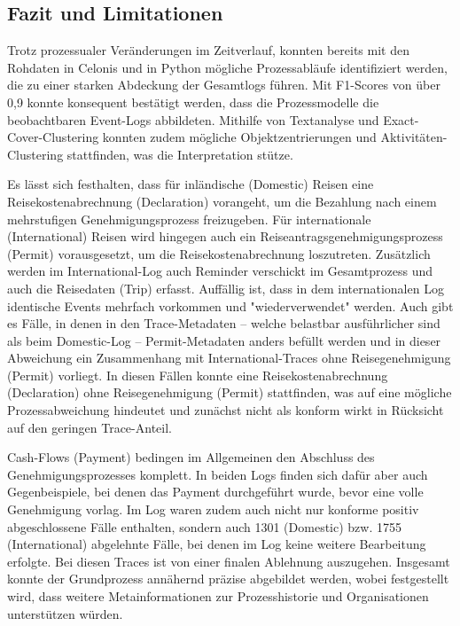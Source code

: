 \subsection{Fazit und Limitationen}
\label{sec:zusammenfassung}
Trotz prozessualer Veränderungen im Zeitverlauf, konnten bereits mit den Rohdaten in Celonis und in Python mögliche Prozessabläufe identifiziert werden, die zu einer starken Abdeckung der Gesamtlogs führen.
Mit F1-Scores von über 0,9 konnte konsequent bestätigt werden, dass die Prozessmodelle die beobachtbaren Event-Logs abbildeten.
Mithilfe von Textanalyse und Exact-Cover-Clustering konnten zudem mögliche Objektzentrierungen und Aktivitäten-Clustering stattfinden, was die Interpretation stütze.\par
Es lässt sich festhalten, dass für inländische (Domestic) Reisen eine Reisekostenabrechnung (Declaration) vorangeht, um die Bezahlung nach einem mehrstufigen Genehmigungsprozess freizugeben.
Für internationale (International) Reisen wird hingegen auch ein Reiseantragsgenehmigungsprozess (Permit) vorausgesetzt, um die Reisekostenabrechnung loszutreten. Zusätzlich werden im International-Log auch Reminder verschickt im Gesamtprozess und auch die Reisedaten (Trip) erfasst.
Auffällig ist, dass in dem internationalen Log identische Events mehrfach vorkommen und "wiederverwendet" werden.
Auch gibt es Fälle, in denen in den Trace-Metadaten -- welche belastbar ausführlicher sind als beim Domestic-Log -- Permit-Metadaten anders befüllt werden und in dieser Abweichung ein Zusammenhang mit International-Traces ohne Reisegenehmigung (Permit) vorliegt.
In diesen Fällen konnte eine Reisekostenabrechnung (Declaration) ohne Reisegenehmigung (Permit) stattfinden, was auf eine mögliche Prozessabweichung hindeutet und zunächst nicht als konform wirkt in Rücksicht auf den geringen Trace-Anteil.
\par
Cash-Flows (Payment) bedingen im Allgemeinen den Abschluss des Genehmigungsprozesses komplett. In beiden Logs finden sich dafür aber auch Gegenbeispiele, bei denen das Payment durchgeführt wurde, bevor eine volle Genehmigung vorlag.
Im Log waren zudem auch nicht nur konforme positiv abgeschlossene Fälle enthalten, sondern auch 1301 (Domestic) bzw. 1755 (International) abgelehnte Fälle, bei denen im Log keine weitere Bearbeitung erfolgte.
Bei diesen Traces ist von einer finalen Ablehnung auszugehen. Insgesamt konnte der Grundprozess annähernd präzise abgebildet werden, wobei festgestellt wird, dass weitere Metainformationen zur Prozesshistorie und Organisationen unterstützen würden.
